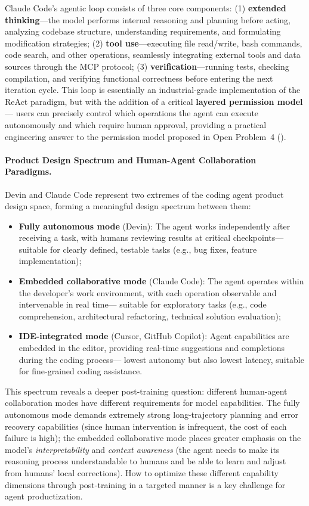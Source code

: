 Claude Code's agentic loop consists of three core components:
(1) \textbf{extended thinking}---the model performs internal reasoning and planning before acting,
analyzing codebase structure, understanding requirements, and formulating modification strategies;
(2) \textbf{tool use}---executing file read/write, bash commands, code search, and other operations,
seamlessly integrating external tools and data sources through the MCP protocol;
(3) \textbf{verification}---running tests, checking compilation, and verifying functional correctness before entering the next iteration cycle.
This loop is essentially an industrial-grade implementation of the ReAct paradigm,
but with the addition of a critical \textbf{layered permission model}---
users can precisely control which operations the agent can execute autonomously
and which require human approval,
providing a practical engineering answer to the permission model proposed in Open Problem~4
().

\paragraph{Product Design Spectrum and Human-Agent Collaboration Paradigms.}
Devin and Claude Code represent two extremes of the coding agent product design space,
forming a meaningful design spectrum between them:
\begin{itemize}[leftmargin=*]
  \item \textbf{Fully autonomous mode} (Devin): The agent works independently after receiving a task,
    with humans reviewing results at critical checkpoints---
    suitable for clearly defined, testable tasks (e.g., bug fixes, feature implementation);
  \item \textbf{Embedded collaborative mode} (Claude Code): The agent operates within the developer's work environment,
    with each operation observable and intervenable in real time---
    suitable for exploratory tasks (e.g., code comprehension, architectural refactoring, technical solution evaluation);
  \item \textbf{IDE-integrated mode} (Cursor, GitHub Copilot): Agent capabilities are embedded in the editor,
    providing real-time suggestions and completions during the coding process---
    lowest autonomy but also lowest latency, suitable for fine-grained coding assistance.
\end{itemize}
This spectrum reveals a deeper post-training question:
different human-agent collaboration modes have different requirements for model capabilities.
The fully autonomous mode demands extremely strong long-trajectory planning and error recovery capabilities
(since human intervention is infrequent, the cost of each failure is high);
the embedded collaborative mode places greater emphasis on the model's \emph{interpretability} and \emph{context awareness}
(the agent needs to make its reasoning process understandable to humans
and be able to learn and adjust from humans' local corrections).
How to optimize these different capability dimensions through post-training in a targeted manner
is a key challenge for agent productization.

